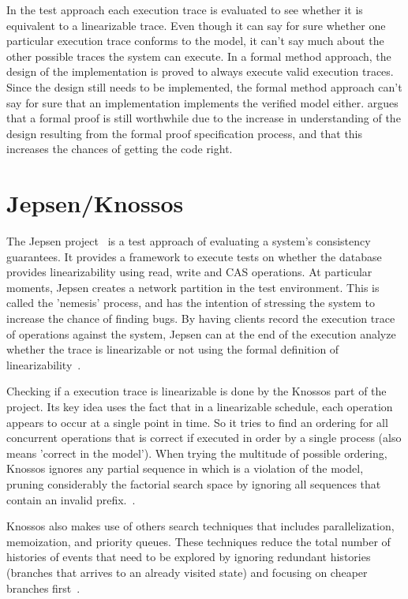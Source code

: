 \documentclass[12pt,conference]{IEEEtran}
\begin{document}
In the test approach each execution trace is evaluated to see whether it is equivalent to a linearizable trace. Even though it can say for sure whether one particular execution trace conforms to the model, it can't say much about the other possible traces the system can execute. In a formal method approach, the design of the implementation is proved to always execute valid execution traces. Since the design still needs to be implemented, the formal method approach can't say for sure that an implementation implements the verified model either. \cite{newcombe2014use} argues that a formal proof is still worthwhile due to the increase in understanding of the design resulting from the formal proof specification process, and that this increases the chances of getting the code right.

\section{Jepsen/Knossos}

The Jepsen project~\cite{jepsenWebsite, jepsenGithubWebsite} is a test approach of evaluating a system's consistency guarantees. It provides a framework to execute tests on whether the database provides linearizability using read, write and CAS operations. At particular moments, Jepsen creates a network partition in the test environment. This is called the 'nemesis' process, and has the intention of stressing the system to increase the chance of finding bugs. By having clients record the execution trace of operations against the system, Jepsen can at the end of the execution analyze whether the trace is linearizable or not using the formal definition of linearizability~\cite{dziuma2013survey}.

Checking if a execution trace is linearizable is done by the Knossos part of the project. Its key idea uses the fact that in a linearizable schedule, each operation appears to occur at a single point in time. So it tries to find an ordering for all concurrent operations that is correct if executed in order by a single process (also means 'correct in the model'). When trying the multitude of possible ordering, Knossos ignores any partial sequence in which is a violation of the model, pruning considerably the factorial search space by ignoring all sequences that contain an invalid prefix.~\cite{knossosPostWebsite}.

Knossos also makes use of others search techniques that includes parallelization, memoization, and priority queues. These techniques reduce the total number of histories of events that need to be explored by ignoring redundant histories (branches that arrives to an already visited state) and focusing on cheaper branches first~\cite{knossosPostWebsite2}.
\end{document}

